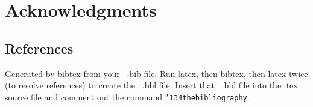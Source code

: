 \documentclass{sig-alternate-05-2015}
\begin{document}
\section{Acknowledgments}

%

%
%
\subsection{References}
Generated by bibtex from your ~.bib file.  Run latex,
then bibtex, then latex twice (to resolve references)
to create the ~.bbl file.  Insert that ~.bbl file into
the .tex source file and comment out
the command \texttt{{\char'134}thebibliography}.
\end{document}
